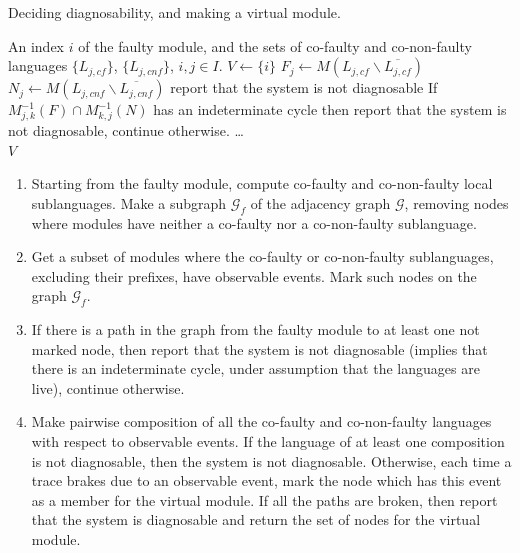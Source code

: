 \documentclass[a4paper, 10pt, conference]{ieeeconf}
\begin{document}
\begin{algorithm} Deciding diagnosability, and making a virtual module.
\label{alg:diagnosability}
\begin{algorithmic}[1]
	\Require An index  $i$ of the faulty module, and the sets of co-faulty and
	co-non-faulty languages $\{L_{j,cf}\}$, $\{L_{j,cnf}\}$, $i,j\in I$.
	\State $V \leftarrow \{i\}$ 
		\State $F_{j} \leftarrow M(L_{j,cf}\backslash \overline{L_{j,cf}})$
		\State $N_{j} \leftarrow M(L_{j,cnf}\backslash \overline{L_{j,cnf}})$
			\State report that the system is not diagnosable 
			\EndIf
		\EndIf
	\EndFor
		\State If $M_{j,k}^{-1}(F) \cap M_{k,j}^{-1}(N)$ has an indeterminate cycle then
		report that the system is not diagnosable, continue otherwise.
		\State \ldots
	\EndFor
	\\
	\Return $V$
\end{algorithmic}
\end{algorithm}


\begin{enumerate}
  \item Starting from the faulty module, compute co-faulty and co-non-faulty
  local sublanguages. Make a subgraph $\mathcal{G}_f$ of the adjacency graph
  $\mathcal{G}$, removing nodes where modules have neither a co-faulty nor a
  co-non-faulty sublanguage.
  
  \item Get a subset of modules where the co-faulty or co-non-faulty
  sublanguages, excluding their prefixes, have observable events. Mark such
  nodes on the graph $\mathcal{G}_f$.
  
  \item If there is a path in the graph from the faulty module to at least one
  not marked node, then report that the system is not diagnosable (implies that
  there is an indeterminate cycle, under assumption that the languages are
  live), continue otherwise.
  
  \item Make pairwise composition of all the co-faulty and co-non-faulty
  languages with respect to observable events. If the language of at least one
  composition is not diagnosable, then the system is not diagnosable.
  Otherwise, each time a trace brakes due to an observable event, mark the node
  which has this event as a member for the virtual module. If all the paths are
  broken, then report that the system is diagnosable and return the set of nodes
  for the virtual module.
\end{enumerate}
\end{document}
